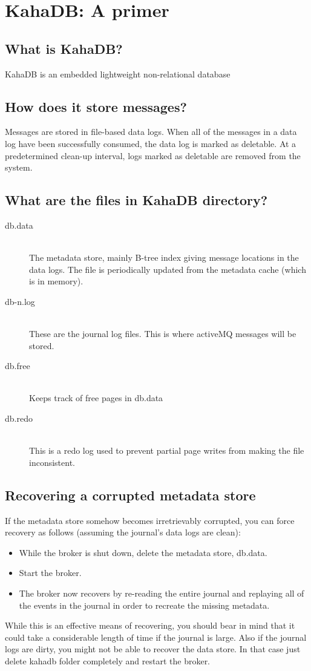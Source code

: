 \section{KahaDB: A primer}
\label{sec:kahadb}
	\subsection{What is KahaDB?}
	KahaDB is an embedded lightweight non-relational database

	\subsection{How does it store messages?}
	Messages are stored in file-based data logs. When all of the messages in a data log have been successfully consumed, the data log is marked as deletable. At a predetermined clean-up interval, logs marked as deletable are removed from the system.


	\subsection{What are the files in KahaDB directory?}
		\begin{description}
			\item[db.data] \hfill \\
				The metadata store, mainly B-tree index giving message locations in the data logs. The file is periodically updated from the metadata cache (which is in memory).
			\item[db-n.log] \hfill \\
				These are the journal log files. This is where activeMQ messages will be stored.
			\item[db.free] \hfill \\
				Keeps track of free pages in db.data
			\item[db.redo] \hfill \\
				This is a redo log used to prevent partial page writes from making the file inconsistent.
		\end{description}


	\subsection{Recovering a corrupted metadata store}
	If the metadata store somehow becomes irretrievably corrupted, you can force recovery as follows (assuming the journal's data logs are clean):

	\begin{itemize}
    	\item While the broker is shut down, delete the metadata store, db.data.
    	\item Start the broker.
    	\item The broker now recovers by re-reading the entire journal and replaying all of the events in the journal in order to recreate the missing metadata.
    \end{itemize}
	While this is an effective means of recovering, you should bear in mind that it could take a considerable length of time if the journal is large. Also if the journal logs are dirty, you might not be able to recover the data store. In that case just delete kahadb folder completely and restart the broker.